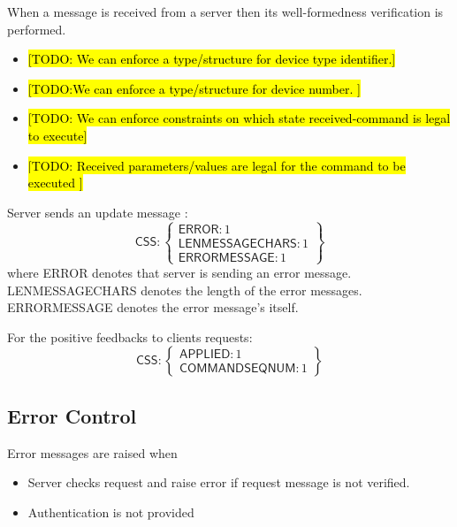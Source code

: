 When a message is received from a server then its well-formedness verification is performed.
\begin{itemize}
\item \hl{[TODO: We can enforce a type/structure for device type identifier.]}
\item \hl{[TODO:We can enforce a type/structure for device number. ]}
\item \hl{[TODO: We can enforce constraints on which state received-command is legal to execute]}
  \item \hl{[TODO: Received parameters/values are legal for the command to be executed ]}
\end{itemize}

Server sends an update message :
\[
\textsf{CSS}:\left\{ \begin{array}{ll}  \textsf{ERROR}:1\\
                                      \textsf{LENMESSAGECHARS}:1 \\
                                       \textsf{ERRORMESSAGE}:1 

           \end{array} \right\}
\]
where \textsf{ERROR} denotes that server is sending an error message. \textsf{LENMESSAGECHARS} denotes the length of the error messages. \textsf{ERRORMESSAGE} denotes the error message's itself.

For the positive feedbacks to clients requests:
\[\textsf{CSS} : \left\{ \begin{array}{ll}  \textsf{APPLIED}:1\\
                                             \textsf{COMMANDSEQNUM}:1
\end{array} \right\}
\]

\subsection{Error Control}
\label{sec:pdus:err}
Error messages are raised when
\begin{itemize}
\item Server checks request and raise error if request message is not verified.
\item Authentication is not provided
  \end{itemize}

